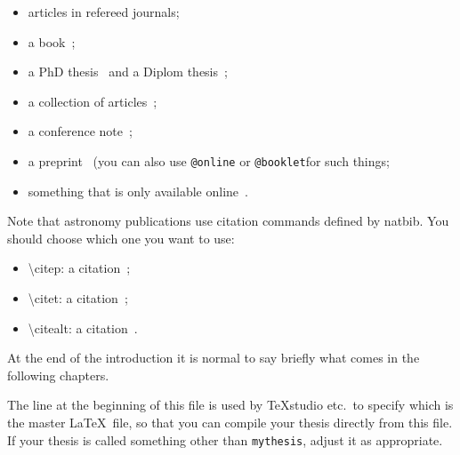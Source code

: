 \begin{itemize}
\item articles in refereed journals\citep{pdg2010,Aad:2010ey};
\item a book~\citep{Halzen:1984mc};
\item a PhD thesis~\citep{tlodd:2012} and a Diplom thesis~\citep{mergelmeyer:2011};
\item a collection of articles~\citep{lhc:vol1};
\item a conference note~\citep{ATLAS-CONF-2011-008};
\item a preprint~\citep{atlas:perf:2009} (you can also use
  \texttt{@online} or \texttt{@booklet}for such things;
\item something that is only available online~\citep{thesis-guide}.
\end{itemize}
Note that astronomy publications use citation commands defined by \textsf{natbib}.
You should choose which one you want to use:
\begin{itemize}
\item \textbackslash citep: a citation~\citep{pdg2010,Aad:2010ey};
\item \textbackslash citet: a citation~\citet{pdg2010,Aad:2010ey};
\item \textbackslash citealt: a citation~\citealt{pdg2010,Aad:2010ey}.
\end{itemize}

At the end of the introduction it is normal to say briefly what comes
in the following chapters.

The line at the beginning of this file is used by TeXstudio etc.\ to
specify which is the master \LaTeX\ file, so that you can compile your thesis
directly from this file.
If your thesis is called something other than \texttt{mythesis}, adjust it as appropriate.

